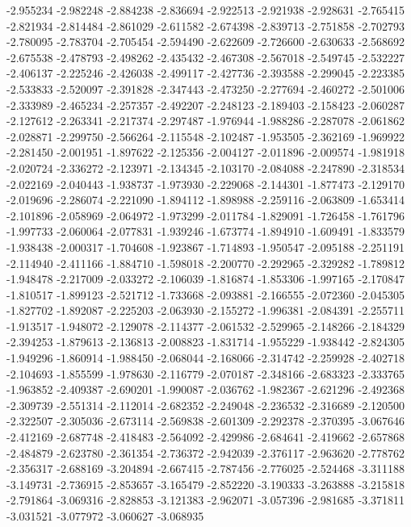 -2.955234
-2.982248
-2.884238
-2.836694
-2.922513
-2.921938
-2.928631
-2.765415
-2.821934
-2.814484
-2.861029
-2.611582
-2.674398
-2.839713
-2.751858
-2.702793
-2.780095
-2.783704
-2.705454
-2.594490
-2.622609
-2.726600
-2.630633
-2.568692
-2.675538
-2.478793
-2.498262
-2.435432
-2.467308
-2.567018
-2.549745
-2.532227
-2.406137
-2.225246
-2.426038
-2.499117
-2.427736
-2.393588
-2.299045
-2.223385
-2.533833
-2.520097
-2.391828
-2.347443
-2.473250
-2.277694
-2.460272
-2.501006
-2.333989
-2.465234
-2.257357
-2.492207
-2.248123
-2.189403
-2.158423
-2.060287
-2.127612
-2.263341
-2.217374
-2.297487
-1.976944
-1.988286
-2.287078
-2.061862
-2.028871
-2.299750
-2.566264
-2.115548
-2.102487
-1.953505
-2.362169
-1.969922
-2.281450
-2.001951
-1.897622
-2.125356
-2.004127
-2.011896
-2.009574
-1.981918
-2.020724
-2.336272
-2.123971
-2.134345
-2.103170
-2.084088
-2.247890
-2.318534
-2.022169
-2.040443
-1.938737
-1.973930
-2.229068
-2.144301
-1.877473
-2.129170
-2.019696
-2.286074
-2.221090
-1.894112
-1.898988
-2.259116
-2.063809
-1.653414
-2.101896
-2.058969
-2.064972
-1.973299
-2.011784
-1.829091
-1.726458
-1.761796
-1.997733
-2.060064
-2.077831
-1.939246
-1.673774
-1.894910
-1.609491
-1.833579
-1.938438
-2.000317
-1.704608
-1.923867
-1.714893
-1.950547
-2.095188
-2.251191
-2.114940
-2.411166
-1.884710
-1.598018
-2.200770
-2.292965
-2.329282
-1.789812
-1.948478
-2.217009
-2.033272
-2.106039
-1.816874
-1.853306
-1.997165
-2.170847
-1.810517
-1.899123
-2.521712
-1.733668
-2.093881
-2.166555
-2.072360
-2.045305
-1.827702
-1.892087
-2.225203
-2.063930
-2.155272
-1.996381
-2.084391
-2.255711
-1.913517
-1.948072
-2.129078
-2.114377
-2.061532
-2.529965
-2.148266
-2.184329
-2.394253
-1.879613
-2.136813
-2.008823
-1.831714
-1.955229
-1.938442
-2.824305
-1.949296
-1.860914
-1.988450
-2.068044
-2.168066
-2.314742
-2.259928
-2.402718
-2.104693
-1.855599
-1.978630
-2.116779
-2.070187
-2.348166
-2.683323
-2.333765
-1.963852
-2.409387
-2.690201
-1.990087
-2.036762
-1.982367
-2.621296
-2.492368
-2.309739
-2.551314
-2.112014
-2.682352
-2.249048
-2.236532
-2.316689
-2.120500
-2.322507
-2.305036
-2.673114
-2.569838
-2.601309
-2.292378
-2.370395
-3.067646
-2.412169
-2.687748
-2.418483
-2.564092
-2.429986
-2.684641
-2.419662
-2.657868
-2.484879
-2.623780
-2.361354
-2.736372
-2.942039
-2.376117
-2.963620
-2.778762
-2.356317
-2.688169
-3.204894
-2.667415
-2.787456
-2.776025
-2.524468
-3.311188
-3.149731
-2.736915
-2.853657
-3.165479
-2.852220
-3.190333
-3.263888
-3.215818
-2.791864
-3.069316
-2.828853
-3.121383
-2.962071
-3.057396
-2.981685
-3.371811
-3.031521
-3.077972
-3.060627
-3.068935
